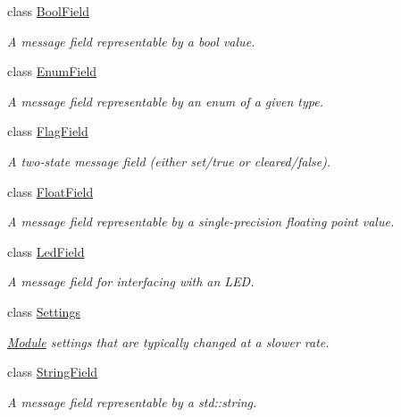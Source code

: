 \begin{DoxyCompactItemize}
\item 
class \hyperlink{classhebi_1_1Info_1_1BoolField}{Bool\+Field}
\begin{DoxyCompactList}\small\item\em A message field representable by a bool value. \end{DoxyCompactList}\item 
class \hyperlink{classhebi_1_1Info_1_1EnumField}{Enum\+Field}
\begin{DoxyCompactList}\small\item\em A message field representable by an enum of a given type. \end{DoxyCompactList}\item 
class \hyperlink{classhebi_1_1Info_1_1FlagField}{Flag\+Field}
\begin{DoxyCompactList}\small\item\em A two-\/state message field (either set/true or cleared/false). \end{DoxyCompactList}\item 
class \hyperlink{classhebi_1_1Info_1_1FloatField}{Float\+Field}
\begin{DoxyCompactList}\small\item\em A message field representable by a single-\/precision floating point value. \end{DoxyCompactList}\item 
class \hyperlink{classhebi_1_1Info_1_1LedField}{Led\+Field}
\begin{DoxyCompactList}\small\item\em A message field for interfacing with an L\+ED. \end{DoxyCompactList}\item 
class \hyperlink{classhebi_1_1Info_1_1Settings}{Settings}
\begin{DoxyCompactList}\small\item\em \hyperlink{classhebi_1_1Module}{Module} settings that are typically changed at a slower rate. \end{DoxyCompactList}\item 
class \hyperlink{classhebi_1_1Info_1_1StringField}{String\+Field}
\begin{DoxyCompactList}\small\item\em A message field representable by a std\+::string. \end{DoxyCompactList}\end{DoxyCompactItemize}
